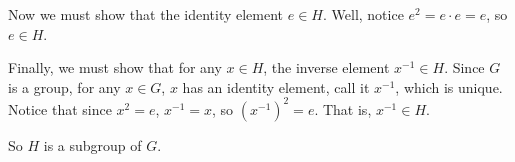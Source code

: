 \documentclass{article}
\begin{document}
Now we must show that the identity element $e \in H$. Well, notice $e^2 = e \cdot e = e$, so $e \in H$.
\newline

Finally, we must show that for any $x \in H$, the inverse element $x^{-1} \in H$. Since $G$ is a group, for any $x \in G$, $x$ has an identity element, call it $x^{-1}$, which is unique. Notice that since $x^2 = e$, $x^{-1} = x$, so $(x^{-1})^2 = e$. That is, $x^{-1} \in H$. 
\newline

So $H$ is a subgroup of $G$.
\end{document}
